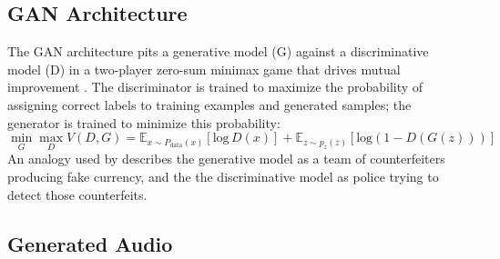 \documentclass[a4paper, dvipsnames, titlepage]{article}
\begin{document}
\subsection{GAN Architecture}

The GAN architecture pits a generative model (G) against a discriminative model (D) in a two-player zero-sum minimax game that drives mutual improvement \citep{2014arXiv1406.2661G}.
The discriminator is trained to maximize the probability of assigning correct labels to training examples and generated samples; the generator is trained to minimize this probability:
\newline
%
\begin{equation}
  \min_{G} \max_{D} V(D,G) = \mathbb{E}_{x \sim P_\mathrm{data}(x)}[\mathrm{log}\,D(x)] + \mathbb{E}_{z \sim p_z(z)}[\mathrm{log} (1 - D(G(z)))]
\end{equation}
%
\newline
An analogy used by \citeauthor{2014arXiv1406.2661G} describes the generative model as a team of counterfeiters producing fake currency, and the the discriminative model as police trying to detect those counterfeits.

\subsection{Generated Audio}
\end{document}
